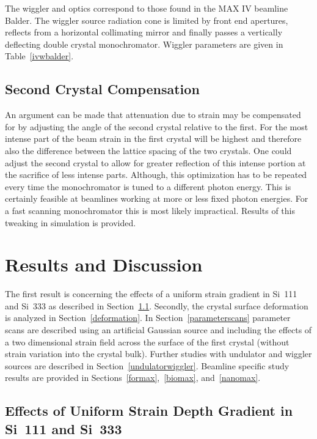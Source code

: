 \documentclass[preprint]{iucr}              %
\begin{document}
The wiggler and optics correspond to those found in the MAX IV beamline Balder. The wiggler source radiation cone is limited by front end apertures, reflects from a horizontal collimating mirror and finally passes a vertically deflecting double crystal monochromator. Wiggler parameters are given in Table~\ref{ivwbalder}.

\subsection{Second Crystal Compensation}

An argument can be made that attenuation due to strain may be compensated for by adjusting the angle of the second crystal relative to the first. For the most intense part of the beam strain in the first crystal will be highest and therefore also the difference between the lattice spacing of the two crystals. One could adjust the second crystal to allow for greater reflection of this intense portion at the sacrifice of less intense parts. Although, this optimization has to be repeated every time the monochromator is tuned to a different photon energy. This is certainly feasible at beamlines working at more or less fixed photon energies. For a fast scanning monochromator this is most likely impractical. Results of this tweaking in simulation is provided.
\section{Results and Discussion}

The first result is concerning the effects of a uniform strain gradient in Si~111 and Si~333 as described in Section~\ref{strain_results}. Secondly, the crystal surface deformation is analyzed in Section~\ref{deformation}. In Section~\ref{parameterscans} parameter scans are described using an artificial Gaussian source and including the effects of a two dimensional strain field across the surface of the first crystal (without strain variation into the crystal bulk). Further studies with undulator and wiggler sources are described in Section~\ref{undulatorwiggler}. Beamline specific study results are provided in Sections~\ref{formax},~\ref{biomax}, and~\ref{nanomax}.

\subsection{Effects of Uniform Strain Depth Gradient in Si~111 and Si~333}\label{strain_results}
\end{document}
